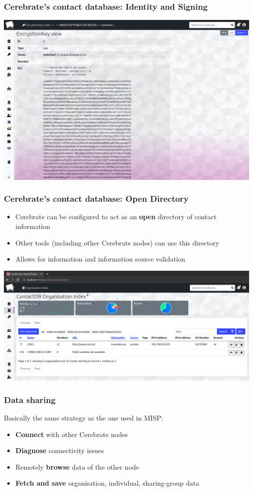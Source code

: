 \begin{frame}
\frametitle{Cerebrate's contact database: Identity and Signing}
    \begin{center}
        \includegraphics[width=0.95\linewidth]{pictures/pgp.png}
    \end{center}
\end{frame}

\begin{frame}
\frametitle{Cerebrate's contact database: Open Directory}
    \begin{itemize}
        \item Cerebrate can be configured to act as an \textbf{open} directory of contact information
        \item Other tools (including other Cerebrate nodes) can use this directory
        \item Allows for information and information source validation
    \end{itemize}
    \begin{center}
        \includegraphics[width=0.8\linewidth]{pictures/open-directory.png}
    \end{center}
\end{frame}

\begin{frame}
\frametitle{Data sharing}
Basically the same strategy as the one used in MISP:
    \begin{itemize}
        \item \textbf{Connect} with other Cerebrate nodes
        \item \textbf{Diagnose} connectivity issues
        \item Remotely \textbf{browse} data of the other node
        \item \textbf{Fetch and save} organisation, individual, sharing-group data
    \end{itemize}
\end{frame}

